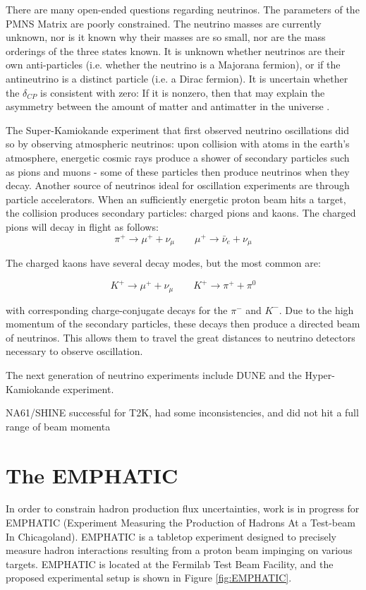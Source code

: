 There are many open-ended questions regarding neutrinos.
The parameters of the PMNS Matrix are poorly constrained.
The neutrino masses are currently unknown, nor is it known why their masses are so small, nor are the mass orderings of the three states known.
It is unknown whether neutrinos are their own anti-particles (i.e. whether the neutrino is a Majorana fermion), or if the antineutrino is a distinct particle (i.e. a Dirac fermion). It is uncertain whether the $\delta_{CP}$ is consistent with zero: If it is nonzero, then that may explain the asymmetry between the amount of matter and antimatter in the universe \cite{neutrinoCP}.

The Super-Kamiokande experiment that first observed neutrino oscillations did so by observing atmospheric neutrinos: upon collision with atoms in the earth's atmosphere, energetic cosmic rays produce a shower of secondary particles such as pions and muons - some of these particles then produce neutrinos when they decay. Another source of neutrinos ideal for oscillation experiments are through particle accelerators. When an sufficiently energetic proton beam hits a target, the collision produces secondary particles: charged pions and kaons. The charged pions will decay in flight as follows:
$$ \pi^+ \rightarrow \mu^+ + \nu_\mu \quad \quad \mu^+ \rightarrow \bar{\nu}_e + \nu_\mu$$

The charged kaons have several decay modes, but the most common are:

$$ K^+ \rightarrow \mu^+ + \nu_\mu \quad \quad K^+ \rightarrow \pi^+ + \pi^0$$

with corresponding charge-conjugate decays for the $\pi^-$ and $K^-$. Due to the high momentum of the secondary particles, these decays then produce a directed beam of neutrinos. This allows them to travel the great distances to neutrino detectors necessary to observe oscillation.

The next generation of neutrino experiments include DUNE and the Hyper-Kamiokande experiment. 

NA61/SHINE successful for T2K, had some inconsistencies, and did not hit a full range of beam momenta

 \section{The \ac{EMPHATIC}}

In order to constrain hadron production flux uncertainties, work is in progress for \ac{EMPHATIC} (Experiment Measuring the Production of Hadrons At a Test-beam In Chicagoland).
\ac{EMPHATIC} is a tabletop experiment designed to precisely measure hadron interactions resulting from a proton beam impinging on various targets. 
\ac{EMPHATIC} is located at the Fermilab Test Beam Facility, and the proposed experimental setup is shown in Figure \ref{fig:EMPHATIC}.


